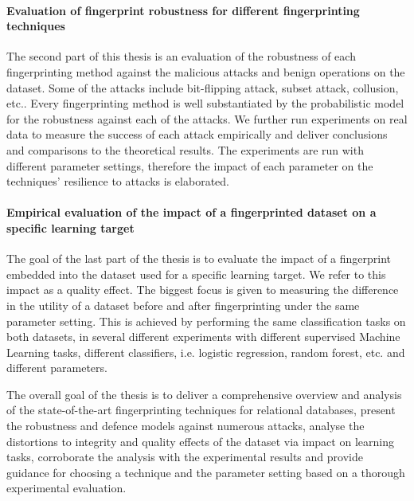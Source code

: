     \paragraph{Evaluation of fingerprint robustness for different fingerprinting techniques} The second part of this thesis is an evaluation of the robustness of each fingerprinting method against the malicious attacks and benign operations on the dataset. Some of the attacks include bit-flipping attack, subset attack, collusion, etc.\cite{halder2010watermarking}. Every fingerprinting method is well substantiated by the probabilistic model for the robustness against each of the attacks. We further run experiments on real data to measure the success of each attack empirically and deliver conclusions and comparisons to the theoretical results. The experiments are run with different parameter settings, therefore the impact of each parameter on the techniques' resilience to attacks is elaborated.

    \paragraph{Empirical evaluation of the impact of a fingerprinted dataset on a specific learning target}
The goal of the last part of the thesis is to evaluate the impact of a fingerprint embedded into the dataset used for a specific learning target. 
We refer to this impact as a quality effect.
The biggest focus is given to measuring the difference in the utility of a dataset before and after fingerprinting under the same parameter setting. 
This is achieved by performing the same classification tasks on both datasets, in several different experiments with different supervised Machine Learning tasks, different classifiers, i.e. logistic regression, random forest, etc. and different parameters. 

The overall goal of the thesis is to deliver a comprehensive overview and analysis of the state-of-the-art fingerprinting techniques for relational databases, present the robustness and defence models against numerous attacks, analyse the distortions to integrity and quality effects of the dataset via impact on learning tasks, corroborate the analysis with the experimental results and provide guidance for choosing a technique and the parameter setting based on a thorough experimental evaluation. 

